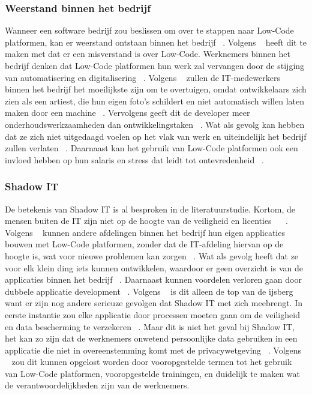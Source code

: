\subsubsection*{Weerstand binnen het bedrijf}
\label{subsec:weerstand-binnen-het-bedrijf}
Wanneer een software bedrijf zou beslissen om over te stappen naar Low-Code platformen, kan er weerstand ontstaan binnen het bedrijf ~\autocite{Elshan2023}. 
Volgens ~\textcite{Elshan2023} heeft dit te maken met dat er een misverstand is over Low-Code. 
Werknemers binnen het bedrijf denken dat Low-Code platformen hun werk zal vervangen door de stijging van automatisering en digitalisering ~\autocite{Elshan2023}. 
Volgens ~\textcite{Elshan2023} zullen de IT-medewerkers binnen het bedrijf het moeilijkste zijn om te overtuigen, omdat ontwikkelaars zich zien als een artiest, 
die hun eigen foto's schildert en niet automatisch willen laten maken door een machine ~\autocite{Elshan2023}. 
Vervolgens geeft dit de developer meer onderhoudswerkzaamheden dan ontwikkelingstaken ~\autocite{Elshan2023}. 
Wat als gevolg kan hebben dat ze zich niet uitgedaagd voelen op het vlak van werk en uiteindelijk het bedrijf zullen verlaten ~\autocite{Elshan2023}. 
Daarnaast kan het gebruik van Low-Code platformen ook een invloed hebben op hun salaris en stress dat leidt tot ontevredenheid ~\autocite{Elshan2023}.
\subsubsection*{Shadow IT}
\label{subsec:shadow-it}
De betekenis van Shadow IT is al besproken in de literatuurstudie. Kortom, de mensen buiten de IT zijn niet op de hoogte van de veiligheid en licenties
 ~\autocite{Yan2021} ~\autocite{Rokis_2022}. 
 Volgens ~\textcite{Elshan2023} kunnen andere afdelingen binnen het bedrijf hun eigen applicaties bouwen met Low-Code platformen, 
 zonder dat de IT-afdeling hiervan op de hoogte is, wat voor nieuwe problemen kan zorgen ~\autocite{Elshan2023}. 
 Wat als gevolg heeft dat ze voor elk klein ding iets kunnen ontwikkelen, waardoor er geen overzicht is van de applicaties binnen het bedrijf ~\autocite{Elshan2023}. 
 Daarnaast kunnen voordelen verloren gaan door dubbele applicatie development ~\autocite{Elshan2023}. 
 Volgens ~\textcite{Elshan2023} is dit alleen de top van de ijsberg want er zijn nog andere serieuze gevolgen dat Shadow IT met zich meebrengt. 
 In eerste instantie zou elke applicatie door processen moeten gaan om de veiligheid en data bescherming te verzekeren ~\autocite{Elshan2023}. 
 Maar dit is niet het geval bij Shadow IT, het kan zo zijn dat de werknemers onwetend persoonlijke data gebruiken in een applicatie die niet in overeenstemming 
 komt met de privacywetgeving ~\autocite{Elshan2023}. Volgens ~\textcite{Elshan2023} zou dit kunnen opgelost worden door vooropgestelde termen tot het 
 gebruik van Low-Code platformen, vooropgestelde trainingen, en duidelijk te maken wat de verantwoordelijkheden zijn van de werknemers.

